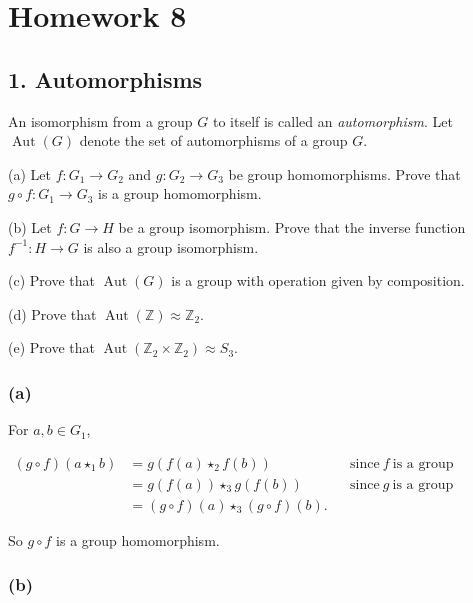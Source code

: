 \chapter{Homework 8}

\section{1. Automorphisms}

An isomorphism from a group \(G\) to itself is called an \emph{automorphism}. Let \(\operatorname{Aut}(G)\) denote the set of automorphisms of a group \(G\).

(a) Let \(f:G_{1}\rightarrow G_{2}\) and \(g:G_{2}\rightarrow G_{3}\) be group homomorphisms. Prove that \(g \circ f:G_{1}\rightarrow G_{3}\) is a group homomorphism.

(b) Let \(f:G\rightarrow H\) be a group isomorphism. Prove that the inverse function \(f^{- 1}:H\rightarrow G\) is also a group isomorphism.

(c) Prove that \(\operatorname{Aut}(G)\) is a group with operation given by composition.

(d) Prove that \(\operatorname{Aut}\left( \mathbb{Z} \right) \approx \mathbb{Z}_{2}\).

(e) Prove that \(\operatorname{Aut}\left( {\mathbb{Z}_{2} \times \mathbb{Z}_{2}} \right) \approx S_{3}\).

\subsection{(a)}

For \(a,b \in G_{1}\),

\[\begin{matrix}
{\left( {g \circ f} \right)\left( {a \star_{1}b} \right)} & {= g\left( {f(a) \star_{2}f(b)} \right)\ } & & {\text{since}\ f\ \text{is a group homomorphism}} \\
 & {= g\left( {f(a)} \right) \star_{3}g\left( {f(b)} \right)\ } & & {\text{since}\ g\ \text{is a group homomorphism}} \\
 & {= \left( {g \circ f} \right)(a) \star_{3}\left( {g \circ f} \right)(b).} & &
\end{matrix}\]

So \(g \circ f\) is a group homomorphism.

\subsection{(b)}


